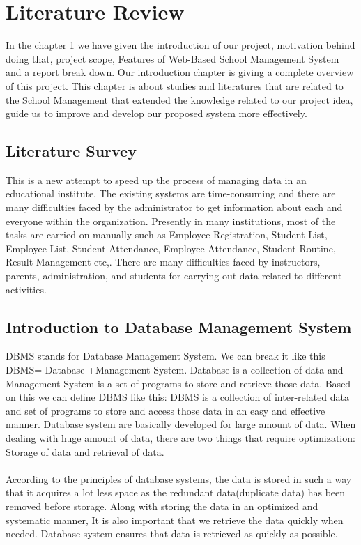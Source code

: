\chapter{Literature Review}
\label{chp2}
In the chapter 1 we have given the introduction of our project, motivation behind doing that, project scope, Features of Web-Based School Management
System and a report break down. Our introduction chapter is giving a complete overview of this project. This chapter is about studies and literatures that are related to the School Management that extended the knowledge related to our project idea, guide us to improve and develop our proposed system more effectively.
\section{Literature Survey}
This is a new attempt to speed up the process of managing data in an educational institute. The existing systems are time-consuming and there are many difficulties faced by the administrator to get information about each and everyone within the organization. Presently in many institutions, most of the tasks are carried on manually such as Employee Registration, Student List, Employee List, Student Attendance, Employee Attendance, Student Routine, Result Management etc,. There are many difficulties faced by instructors, parents, administration, and students for carrying out data related to different activities. 
\section{Introduction to Database Management System}
DBMS stands for Database Management System. We can break it like this DBMS= Database +Management System. Database is a collection of data and Management System
is a set of programs to store and retrieve those data. Based on this we can define DBMS like this: DBMS is a collection of inter-related data and set of programs to store and access those data in an easy and effective manner.
Database system are basically developed for large amount of data. When dealing with huge amount of data, there are two things that require optimization: Storage of data and retrieval of data.\\\\
According to the principles of database systems, the data is stored in such a way that it acquires a lot less space as the redundant data(duplicate data)
has been removed before storage. Along with storing the data in an optimized and systematic manner, It is also important that we retrieve the data quickly when needed. Database system ensures that data is retrieved as quickly as possible.
